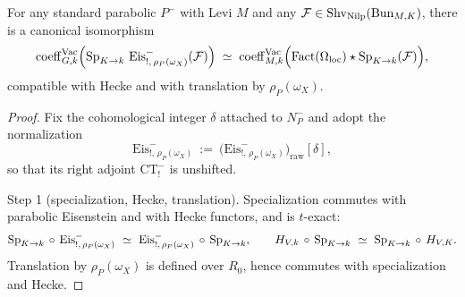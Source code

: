 \begin{theorem}\label{thm:parabolic-zastava-flatness}
For any standard parabolic $P^-$ with Levi $M$ and any $\mathcal F\in \mathrm{Shv}_{\mathrm{Nilp}}(\mathrm{Bun}_{M,K})$, there is a canonical isomorphism
\[
 \mathrm{coeff}^{\mathrm{Vac}}_{G,k}\Bigl(\operatorname{Sp}_{K\to k}\,\mathrm{Eis}^-_{!,\,\rho_P(\omega_X)}(\mathcal F)\Bigr)
 \;\simeq\; \mathrm{coeff}^{\mathrm{Vac}}_{M,k}\Bigl(\mathrm{Fact}(\Omega_{\mathrm{loc}})\star\operatorname{Sp}_{K\to k}(\mathcal F)\Bigr),
\]
compatible with Hecke and with translation by $\rho_P(\omega_X)$.
\end{theorem}

\begin{proof}
Fix the cohomological integer $\delta$ attached to $N^-_P$ and adopt the normalization
\[
\mathrm{Eis}^-_{!,\,\rho_P(\omega_X)}\ :=\ \bigl(\mathrm{Eis}^-_{!,\,\rho_P(\omega_X)}\bigr)_{\mathrm{raw}}[\delta],
\]
so that its right adjoint $\mathrm{CT}^-_!$ is unshifted.

Step 1 (specialization, Hecke, translation). Specialization commutes with parabolic Eisenstein and with Hecke functors, and is $t$-exact:
\[
\Sp_{K\to k}\ccomp \mathrm{Eis}^-_{!,\,\rho_P(\omega_X)}\ \simeq\ \mathrm{Eis}^-_{!,\,\rho_P(\omega_X)}\ccomp \Sp_{K\to k},\qquad
H_{V,k}\ccomp \Sp_{K\to k}\ \simeq\ \Sp_{K\to k}\ccomp H_{V,K}.
\]
Translation by $\rho_P(\omega_X)$ is defined over $R_0$, hence commutes with specialization and Hecke.


\end{proof}
